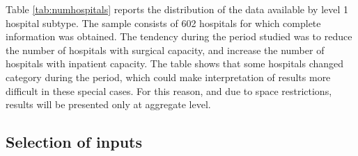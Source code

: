 \documentclass[11pt,a4paper,oneside]{article}
\begin{document}
Table \ref{tab:numhospitals} reports the distribution of the data available by level 1 hospital subtype. The sample consists of 602 hospitals for which complete information was obtained. The tendency during the period studied was to reduce the number of hospitals with surgical capacity, and increase the number of hospitals with inpatient capacity. The table shows that some hospitals changed category during the period, which could make interpretation of results more difficult in these special cases. For this reason, and due to space restrictions, results will be presented only at aggregate level.


\subsection{Selection of inputs}
\label{sec:inputs}


\end{document}
